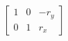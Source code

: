 \documentclass[preview]{standalone}
\begin{document}
\begin{align*}
\begin{bmatrix} 1 & 0 & -r_y \\ 0 & 1 & r_x \end{bmatrix}
\end{align*}
\end{document}

